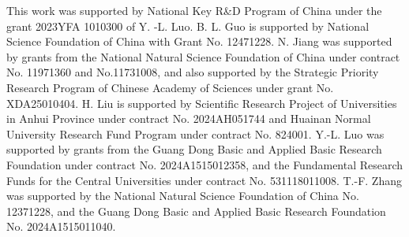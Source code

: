 \documentclass[reqno,11pt]{amsart}
\numberwithin{equation}{section}
\begin{document}
This work was supported by National Key R\&D Program of China under the grant 2023YFA 1010300 of Y. -L. Luo. B. L. Guo is supported by National Science Foundation of China with Grant No. 12471228. N. Jiang was supported by grants from the National Natural Science Foundation of China under contract No. 11971360 and No.11731008, and also supported by the Strategic Priority Research Program of Chinese Academy of Sciences under grant No. XDA25010404.  H. Liu is supported by Scientific Research Project of Universities in Anhui Province under contract No. 2024AH051744 and Huainan Normal University Research Fund Program under contract No. 824001.  Y.-L. Luo was supported by grants from the Guang Dong Basic and Applied Basic Research Foundation under contract No. 2024A1515012358, and the Fundamental Research Funds for the Central Universities under contract No. 531118011008. T.-F. Zhang was supported by the National Natural Science Foundation of China No. 12371228, and the Guang Dong Basic and Applied Basic Research Foundation No. 2024A1515011040. 
 
\end{document}
